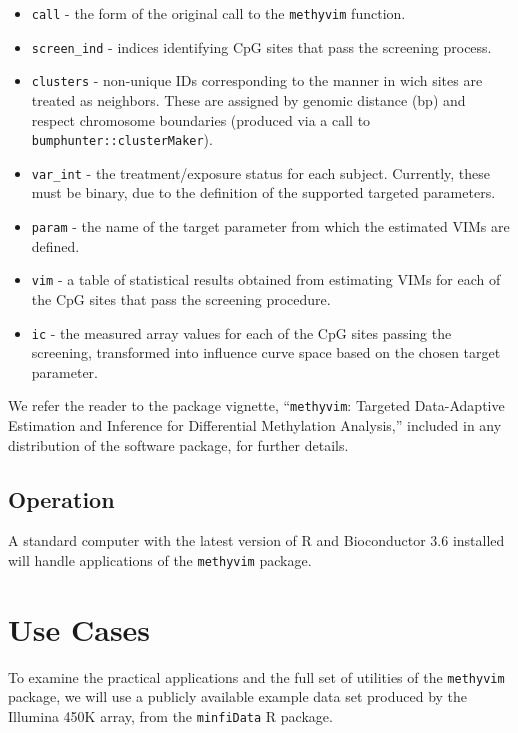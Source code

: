 \documentclass[9pt,a4paper,]{extarticle}
\theoremstyle{definition}
\theoremstyle{definition}
\theoremstyle{definition}
\theoremstyle{remark}
\begin{document}
\begin{itemize}
\item
  \texttt{call} - the form of the original call to the \texttt{methyvim} function.
\item
  \texttt{screen\_ind} - indices identifying CpG sites that pass the screening process.
\item
  \texttt{clusters} - non-unique IDs corresponding to the manner in wich sites are
  treated as neighbors. These are assigned by genomic distance (bp) and respect
  chromosome boundaries (produced via a call to \texttt{bumphunter::clusterMaker}).
\item
  \texttt{var\_int} - the treatment/exposure status for each subject. Currently, these
  must be binary, due to the definition of the supported targeted parameters.
\item
  \texttt{param} - the name of the target parameter from which the estimated VIMs are
  defined.
\item
  \texttt{vim} - a table of statistical results obtained from estimating VIMs for
  each of the CpG sites that pass the screening procedure.
\item
  \texttt{ic} - the measured array values for each of the CpG sites passing the
  screening, transformed into influence curve space based on the chosen target
  parameter.
\end{itemize}

We refer the reader to the package vignette, ``\texttt{methyvim}: Targeted Data-Adaptive
Estimation and Inference for Differential Methylation Analysis,'' included in any
distribution of the software package, for further details.

\hypertarget{operation}{%
\subsection{Operation}\label{operation}}

A standard computer with the latest version of R and Bioconductor 3.6 installed
will handle applications of the \texttt{methyvim} package.

\hypertarget{use-cases}{%
\section{Use Cases}\label{use-cases}}

To examine the practical applications and the full set of utilities of the
\texttt{methyvim} package, we will use a publicly available example data set produced
by the Illumina 450K array, from the \texttt{minfiData} R package.
\end{document}
